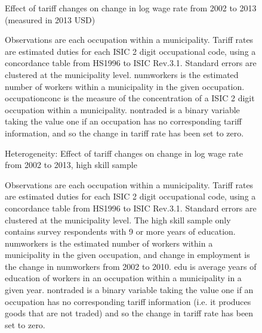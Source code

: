 \documentclass[12pt]{article}
\begin{document}
\begin{landscape}
\begin{figure}[H]
\end{figure}

\begin{figure}[H]
\begin{center}
Effect of tariff changes on change in log wage rate from 2002 to 2013 (measured in 2013 USD)

\caption{\label{fig:Table2}}
\end{center}
Observations are each occupation within a municipality.
Tariff rates are estimated duties for each ISIC 2 digit occupational code,
using a concordance table from HS1996 to ISIC Rev.3.1. Standard errors are clustered at the 
municipality level. numworkers is the estimated
number of workers within a municipality in the given occupation. occupationconc is the measure of
the concentration of a ISIC 2 digit occupation within a municipality. nontraded is a binary variable
taking the value one if an occupation has no corresponding tariff information, and so the change in
tariff rate has been set to zero.
\end{figure}

\begin{figure}[H]
\begin{center}
Heterogeneity: Effect of tariff changes on change in log wage rate from 2002 to 2013, high skill sample

\caption{\label{fig:Table4}}
\end{center}
\small{Observations are each occupation within a municipality.
Tariff rates are estimated duties for each ISIC 2 digit occupational code,
using a concordance table from HS1996 to ISIC Rev.3.1. Standard errors are clustered at the 
municipality level. The high skill sample only 
contains survey respondents with 9 or more years of education. numworkers is the estimated
number of workers within a municipality in the given occupation, and change in employment
is the change in numworkers from 2002 to 2010. edu is average years of education 
of workers in an occupation within a municipality in a given year. nontraded is a binary variable
taking the value one if an occupation has no corresponding tariff information (i.e. it produces goods
that are not traded) and so the change in
tariff rate has been set to zero.}
\end{figure}


\end{landscape}
\end{document}
